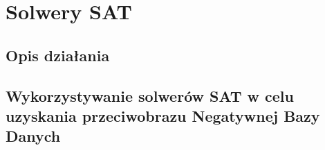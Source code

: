 \chapter{Solwery SAT}

\section{Opis działania}

\section{Wykorzystywanie solwerów SAT w celu uzyskania przeciwobrazu Negatywnej Bazy Danych}

